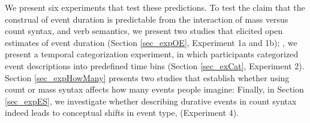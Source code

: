 \documentclass[preprint,12pt,authoryear]{elsarticle}
\begin{document}
We present six experiments that test these predictions. To test the claim that the construal of event duration is predictable from the interaction of mass versus count syntax, and verb semantics, we present two studies that elicited open estimates of event duration (Section \ref{sec_expOE}, Experiment 1a and 1b); , we  present a temporal categorization experiment, in which participants categorized event descriptions into predefined time bins (Section \ref{sec_exCat}, Experiment 2). Section \ref{sec_expHowMany} presents two studies that establish whether using count or mass syntax affects how many events people imagine:  Finally, in Section \ref{sec_expES}, we investigate whether describing durative events in count syntax indeed leads to conceptual shifts in event type,  (Experiment 4).
\end{document}
